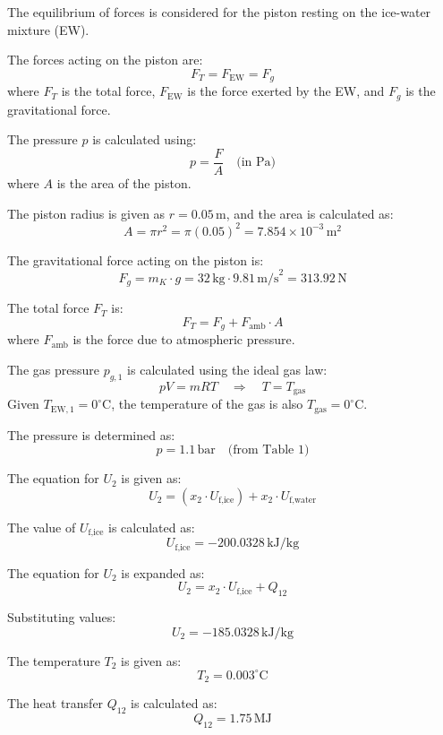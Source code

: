 The equilibrium of forces is considered for the piston resting on the ice-water mixture (EW).  

The forces acting on the piston are:  
\[
F_T = F_{\text{EW}} = F_g
\]  
where \( F_T \) is the total force, \( F_{\text{EW}} \) is the force exerted by the EW, and \( F_g \) is the gravitational force.  

The pressure \( p \) is calculated using:  
\[
p = \frac{F}{A} \quad \text{(in \(\text{Pa}\))}
\]  
where \( A \) is the area of the piston.  

The piston radius is given as \( r = 0.05 \, \text{m} \), and the area is calculated as:  
\[
A = \pi r^2 = \pi (0.05)^2 = 7.854 \times 10^{-3} \, \text{m}^2
\]  

The gravitational force acting on the piston is:  
\[
F_g = m_K \cdot g = 32 \, \text{kg} \cdot 9.81 \, \text{m/s}^2 = 313.92 \, \text{N}
\]  

The total force \( F_T \) is:  
\[
F_T = F_g + F_{\text{amb}} \cdot A
\]  
where \( F_{\text{amb}} \) is the force due to atmospheric pressure.

The gas pressure \( p_{g,1} \) is calculated using the ideal gas law:  
\[
pV = mRT \quad \Rightarrow \quad T = T_{\text{gas}}
\]  
Given \( T_{\text{EW},1} = 0^\circ\text{C} \), the temperature of the gas is also \( T_{\text{gas}} = 0^\circ\text{C} \).  

The pressure is determined as:  
\[
p = 1.1 \, \text{bar} \quad \text{(from Table 1)}  
\]

The equation for \( U_2 \) is given as:  
\[
U_2 = (x_2 \cdot U_{\text{f,ice}}) + x_2 \cdot U_{\text{f,water}}
\]  

The value of \( U_{\text{f,ice}} \) is calculated as:  
\[
U_{\text{f,ice}} = -200.0328 \, \text{kJ/kg}
\]  

The equation for \( U_2 \) is expanded as:  
\[
U_2 = x_2 \cdot U_{\text{f,ice}} + Q_{12}
\]  

Substituting values:  
\[
U_2 = -185.0328 \, \text{kJ/kg}
\]  

The temperature \( T_2 \) is given as:  
\[
T_2 = 0.003^\circ \text{C}
\]  

The heat transfer \( Q_{12} \) is calculated as:  
\[
Q_{12} = 1.75 \, \text{MJ}
\]